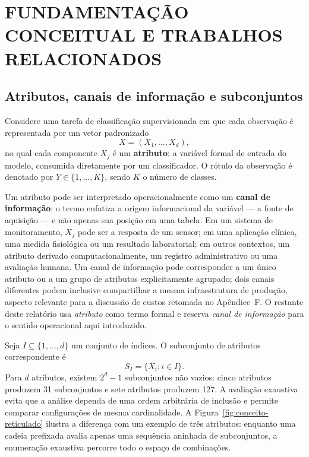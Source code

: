 \chapter{FUNDAMENTAÇÃO CONCEITUAL E TRABALHOS RELACIONADOS}

\section{Atributos, canais de informação e subconjuntos}

Considere uma tarefa de classificação supervisionada em que cada observação é representada por um vetor padronizado
\begin{equation}
  X=(X_1,\ldots,X_d),
  \label{eq:input-vector}
\end{equation}
no qual cada componente $X_j$ é um \textbf{atributo}: a variável formal de entrada do modelo, consumida diretamente por um classificador. O rótulo da observação é denotado por $Y\in\{1,\ldots,K\}$, sendo $K$ o número de classes.

Um atributo pode ser interpretado operacionalmente como um \textbf{canal de informação}: o termo enfatiza a origem informacional da variável --- a fonte de aquisição --- e não apenas sua posição em uma tabela. Em um sistema de monitoramento, $X_j$ pode ser a resposta de um sensor; em uma aplicação clínica, uma medida fisiológica ou um resultado laboratorial; em outros contextos, um atributo derivado computacionalmente, um registro administrativo ou uma avaliação humana. Um canal de informação pode corresponder a um único atributo ou a um grupo de atributos explicitamente agrupado; dois canais diferentes podem inclusive compartilhar a mesma infraestrutura de produção, aspecto relevante para a discussão de custos retomada no Apêndice~F. O restante deste relatório usa \emph{atributo} como termo formal e reserva \emph{canal de informação} para o sentido operacional aqui introduzido.

Seja $I\subseteq\{1,\ldots,d\}$ um conjunto de índices. O subconjunto de atributos correspondente é
\begin{equation}
  S_I=\{X_i:i\in I\}.
  \label{eq:subset-si}
\end{equation}
Para $d$ atributos, existem $2^d-1$ subconjuntos não vazios: cinco atributos produzem 31 subconjuntos e sete atributos produzem 127. A avaliação exaustiva evita que a análise dependa de uma ordem arbitrária de inclusão e permite comparar configurações de mesma cardinalidade. A Figura~\ref{fig:conceito-reticulado} ilustra a diferença com um exemplo de três atributos: enquanto uma cadeia prefixada avalia apenas uma sequência aninhada de subconjuntos, a enumeração exaustiva percorre todo o espaço de combinações.

